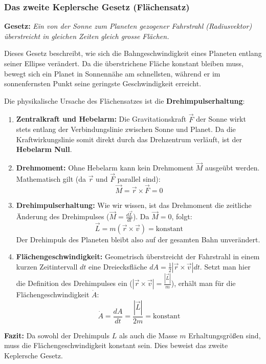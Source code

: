 \subsubsection{Das zweite Keplersche Gesetz (Flächensatz)}

\textbf{Gesetz:} \textit{Ein von der Sonne zum Planeten gezogener Fahrstrahl (Radiusvektor) überstreicht in gleichen Zeiten gleich grosse Flächen.}

Dieses Gesetz beschreibt, wie sich die Bahngeschwindigkeit eines Planeten entlang seiner Ellipse verändert. Da die überstrichene Fläche konstant bleiben muss, bewegt sich ein Planet in Sonnennähe  am schnellsten, während er im sonnenfernsten Punkt seine geringste Geschwindigkeit erreicht.


Die physikalische Ursache des Flächensatzes ist die \textbf{Drehimpulserhaltung}:

\begin{enumerate}
    \item \textbf{Zentralkraft und Hebelarm:} Die Gravitationskraft $\vec{F}$ der Sonne wirkt stets entlang der Verbindungslinie zwischen Sonne und Planet. Da die Kraftwirkungslinie somit direkt durch das Drehzentrum verläuft, ist der \textbf{Hebelarm Null}.

    \item \textbf{Drehmoment:} Ohne Hebelarm kann kein Drehmoment $\vec{M}$ ausgeübt werden. Mathematisch gilt (da $\vec{r}$ und $\vec{F}$ parallel sind):
          \begin{equation}
              \vec{M} = \vec{r} \times \vec{F} = 0
          \end{equation}

    \item \textbf{Drehimpulserhaltung:} Wie wir wissen, ist das Drehmoment die zeitliche Änderung des Drehimpulses ($\vec{M} = \frac{d\vec{L}}{dt}$). Da $\vec{M} = 0$, folgt:
          \begin{equation}
              \vec{L} = m (\vec{r} \times \vec{v}) = \text{konstant}
          \end{equation}
          Der Drehimpuls des Planeten bleibt also auf der gesamten Bahn unverändert.

    \item \textbf{Flächengeschwindigkeit:} Geometrisch überstreicht der Fahrstrahl in einem kurzen Zeitintervall $dt$ eine Dreiecksfläche $dA = \frac{1}{2} |\vec{r} \times \vec{v}| dt$. Setzt man hier die Definition des Drehimpulses ein ($|\vec{r} \times \vec{v}| = \frac{|\vec{L}|}{m}$), erhält man für die Flächengeschwindigkeit $\dot{A}$:
          \begin{equation}
              \dot{A} = \frac{dA}{dt} = \frac{|\vec{L}|}{2m} = \text{konstant}
          \end{equation}
\end{enumerate}

\textbf{Fazit:} Da sowohl der Drehimpuls $L$ als auch die Masse $m$ Erhaltungsgrößen sind, muss die Flächengeschwindigkeit konstant sein. Dies beweist das zweite Keplersche Gesetz.